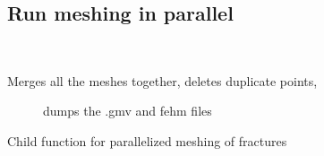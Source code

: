 \documentclass[letterpaper,10pt,english]{sphinxmanual}
\begin{document}
\subsection{Run meshing in parallel}
\label{\detokenize{pydfnworks:run-meshing-in-parallel}}\label{\detokenize{pydfnworks:module-pydfnworks.run_meshing}}\label{\detokenize{pydfnworks:module-run_meshing.py}}

\begin{fulllineitems}
\label{\detokenize{pydfnworks:pydfnworks.run_meshing.merge_the_meshes}}~\begin{description}
\item[{Merges all the meshes together, deletes duplicate points, }] \leavevmode
dumps the .gmv and fehm files

\end{description}

\end{fulllineitems}


\begin{fulllineitems}
\label{\detokenize{pydfnworks:pydfnworks.run_meshing.mesh_fracture}}
Child function for parallelized meshing of fractures

\end{fulllineitems}

\end{document}
